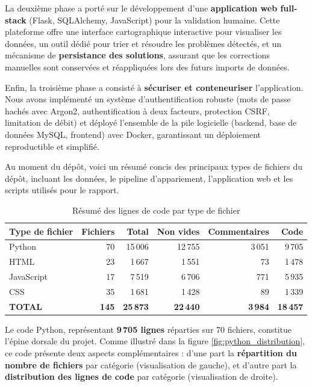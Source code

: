 La deuxième phase a porté sur le développement d'une \textbf{application web full-stack} (Flask, SQLAlchemy, JavaScript) pour la validation humaine. Cette plateforme offre une interface cartographique interactive pour visualiser les données, un outil dédié pour trier et résoudre les problèmes détectés, et un mécanisme de \textbf{persistance des solutions}, assurant que les corrections manuelles sont conservées et réappliquées lors des futurs imports de données.

Enfin, la troisième phase a consisté à \textbf{sécuriser et conteneuriser} l'application. Nous avons implémenté un système d'authentification robuste (mots de passe hachés avec Argon2, authentification à deux facteurs, protection CSRF, limitation de débit) et déployé l'ensemble de la pile logicielle (backend, base de données MySQL, frontend) avec Docker, garantissant un déploiement reproductible et simplifié.

Au moment du dépôt, voici un résumé concis des principaux types de fichiers du dépôt, incluant les données, le pipeline d'appariement, l'application web et les scripts utilisés pour le rapport.

\begin{table}[h]
\centering
\caption{Résumé des lignes de code par type de fichier}
\label{tab:code_summary}
\begin{tabular}{|l|r|r|r|r|r|}
\hline
\textbf{Type de fichier} & \textbf{Fichiers} & \textbf{Total} & \textbf{Non vides} & \textbf{Commentaires} & \textbf{Code} \\
\hline
Python & 70 & 15\,006 & 12\,755 & 3\,051 & 9\,705 \\
HTML & 23 & 1\,667 & 1\,551 & 73 & 1\,478 \\
JavaScript & 17 & 7\,519 & 6\,706 & 771 & 5\,935 \\
CSS & 35 & 1\,681 & 1\,428 & 89 & 1\,339 \\
\hline
\textbf{TOTAL} & \textbf{145} & \textbf{25\,873} & \textbf{22\,440} & \textbf{3\,984} & \textbf{18\,457} \\
\hline
\end{tabular}
\end{table}

Le code Python, représentant \textbf{9\,705 lignes} réparties sur 70 fichiers, constitue l'épine dorsale du projet. Comme illustré dans la figure \ref{fig:python_distribution}, ce code présente deux aspects complémentaires : d'une part la \textbf{répartition du nombre de fichiers} par catégorie (visualisation de gauche), et d'autre part la \textbf{distribution des lignes de code} par catégorie (visualisation de droite).

